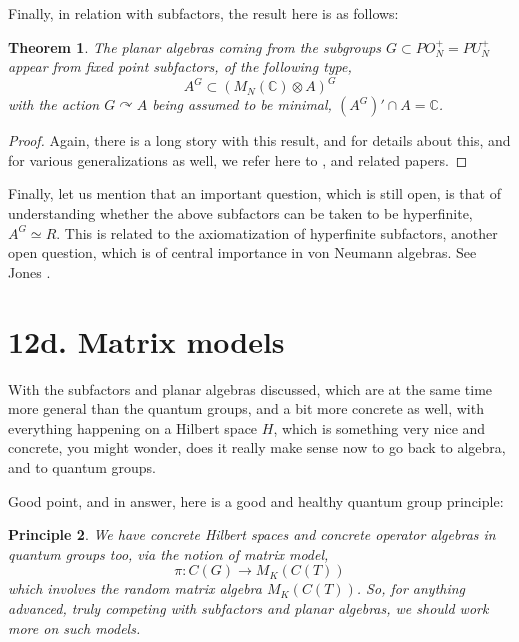 \documentclass[12pt]{amsbook}
\newtheorem{theorem}{Theorem}[chapter]
\newtheorem{principle}[theorem]{Principle}
\begin{document}
Finally, in relation with subfactors, the result here is as follows:


\begin{theorem}
The planar algebras coming from the subgroups $G\subset PO_N^+=PU_N^+$ appear from fixed point subfactors, of the following type,
$$A^G\subset(M_N(\mathbb C)\otimes A)^G$$
with the action $G\curvearrowright A$ being assumed to be minimal, $(A^G)'\cap A=\mathbb C$.
\end{theorem}

\begin{proof}
Again, there is a long story with this result, and for details about this, and for various generalizations as well, we refer here to \cite{ba1}, \cite{twa} and related papers.
\end{proof}

Finally, let us mention that an important question, which is still open, is that of understanding whether the above subfactors can be taken to be hyperfinite, $A^G\simeq R$. This is related to the axiomatization of hyperfinite subfactors, another open question, which is of central importance in von Neumann algebras. See Jones \cite{jo1}.

\section*{12d. Matrix models}

With the subfactors and planar algebras discussed, which are at the same time more general than the quantum groups, and a bit more concrete as well, with everything happening on a Hilbert space $H$, which is something very nice and concrete, you might wonder, does it really make sense now to go back to algebra, and to quantum groups.

\bigskip

Good point, and in answer, here is a good and healthy quantum group principle:

\begin{principle}
We have concrete Hilbert spaces and concrete operator algebras in quantum groups too, via the notion of matrix model,
$$\pi:C(G)\to M_K(C(T))$$
which involves the random matrix algebra $M_K(C(T))$. So, for anything advanced, truly competing with subfactors and planar algebras, we should work more on such models.
\end{principle}
\end{document}
